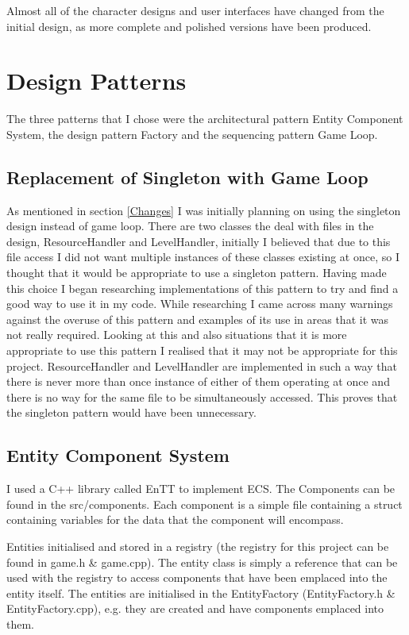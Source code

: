\documentclass{article}
\begin{document}
Almost all of the character designs and user interfaces have changed from the initial design, as more complete and polished versions have been produced.

\section{Design Patterns}\label{Patterns}

The three patterns that I chose were the architectural pattern Entity Component System, the design pattern Factory and the sequencing pattern Game Loop. 

\subsection{Replacement of Singleton with Game Loop}

As mentioned in section \ref{Changes} I was initially planning on using the singleton design instead of game loop. 
There are two classes the deal with files in the design, ResourceHandler and LevelHandler, 
initially I believed that due to this file access I did not want multiple instances of these classes existing at once, so I thought that it would be appropriate to use a singleton pattern.
Having made this choice I began researching implementations of this pattern to try and find a good way to use it in my code.
While researching I came across many warnings against the overuse of this pattern and examples of its use in areas that it was not really required. 
Looking at this and also situations that it is more appropriate to use this pattern I realised that it may not be appropriate for this project.
ResourceHandler and LevelHandler are implemented in such a way that there is never more than once instance of either of them operating at once and there is no way for the same file to be simultaneously accessed.
This proves that the singleton pattern would have been unnecessary.

\subsection{Entity Component System}

I used a C++ library called EnTT to implement ECS.
The Components can be found in the  src/components.
Each component is a simple file containing a struct containing variables for the data that the component will encompass.

Entities initialised and stored in a registry (the registry for this project can be found in game.h & game.cpp).
The entity class is simply a reference that can be used with the registry to access components that have been emplaced into the entity itself.
The entities are initialised in the EntityFactory (EntityFactory.h & EntityFactory.cpp), e.g. they are created and have components emplaced into them.
\end{document}

